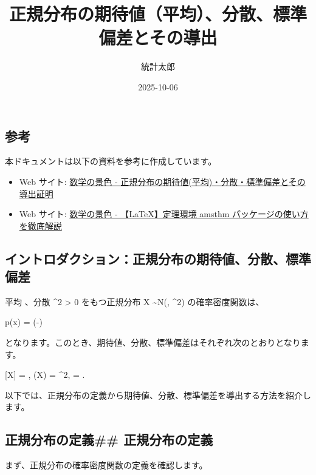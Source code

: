 \documentclass[
  11pt,
  a4paper,
]{extarticle}
\title{正規分布の期待値（平均）、分散、標準偏差とその導出}
\author{統計太郎}
\date{2025-10-06}
\providecommand{\tightlist}{%
  \setlength{\itemsep}{0pt}\setlength{\parskip}{0pt}}
\numberwithin{equation}{section}
\theoremstyle{plain}
\theoremstyle{definition}
\begin{document}
\maketitle

\subsection{参考}\label{ux53c2ux8003}

本ドキュメントは以下の資料を参考に作成しています。

\begin{itemize}
\tightlist
\item
  Web サイト:
  \href{https://mathlandscape.com/normal-distrib-ev/}{数学の景色 -
  正規分布の期待値(平均)・分散・標準偏差とその導出証明}
\item
  Web サイト: \href{https://mathlandscape.com/latex-amsthm/}{数学の景色
  - 【LaTeX】定理環境 amsthm パッケージの使い方を徹底解説}
\end{itemize}

\tableofcontents

\newpage

\subsection{イントロダクション：正規分布の期待値、分散、標準偏差}\label{ux30a4ux30f3ux30c8ux30edux30c0ux30afux30b7ux30e7ux30f3ux6b63ux898fux5206ux5e03ux306eux671fux5f85ux5024ux5206ux6563ux6a19ux6e96ux504fux5dee}

平均 \mu \in {}、分散 \sigma\^{}2 \textgreater{} 0
をもつ正規分布 X \sim N(\mu, \sigma\^{}2) の確率密度関数は、

p(x) = 
\exp\left(-\right)

となります。このとき、期待値、分散、標準偏差はそれぞれ次のとおりとなります。

[X] = \mu, \qquad {}(X) = \sigma\^{}2,
\qquad {} = \sigma.

以下では、正規分布の定義から期待値、分散、標準偏差を導出する方法を紹介します。

\subsection{正規分布の定義\#\#
正規分布の定義}\label{ux6b63ux898fux5206ux5e03ux306eux5b9aux7fa9-ux6b63ux898fux5206ux5e03ux306eux5b9aux7fa9}

まず、正規分布の確率密度関数の定義を確認します。
\end{document}
